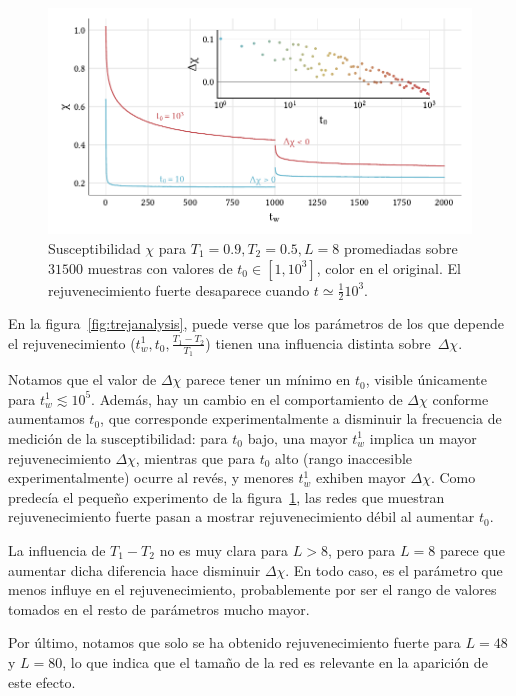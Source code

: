 \documentclass[11pt]{report}
\begin{document}
\begin{figure}
  \centering
  \includegraphics{../study_cases/vanishingrejuvenation/trej.pdf}
  \caption{Susceptibilidad $χ$ para $T_1=0.9, T_2=0.5, L=8$
    promediadas sobre $31500$ muestras con valores de $t_0∈[1,10^3]$,
    color en el original. El rejuvenecimiento fuerte desaparece cuando
    $t ≃ \frac{1}{2} 10^3$.}
  \label{fig:vanishing}
\end{figure}


En la figura~\ref{fig:trejanalysis}, puede verse que los parámetros de
los que depende el rejuvenecimiento ($t_w^1, t_0,
\frac{T_1-T_2}{T_1}$) tienen una influencia distinta sobre~$Δχ$.

Notamos que el valor de $Δχ$ parece tener un mínimo en $t_0$, visible
únicamente para $t_w^1 ≲10^5$. Además, hay un cambio en el
comportamiento de $Δχ$ conforme aumentamos $t_0$, que corresponde
experimentalmente a disminuir la frecuencia de medición de la
susceptibilidad: para $t_0$ bajo, una mayor $t_w^1$ implica un mayor
rejuvenecimiento $Δχ$, mientras que para $t_0$ alto (rango inaccesible
experimentalmente) ocurre al revés, y menores $t_w^1$ exhiben mayor
$Δχ$. Como predecía el pequeño experimento de la
figura~\ref{fig:vanishing}, las redes que muestran rejuvenecimiento
fuerte pasan a mostrar rejuvenecimiento débil al aumentar $t_0$.

La influencia de $T_1-T_2$ no es muy clara para $L>8$, pero para $L=8$
parece que aumentar dicha diferencia hace disminuir $Δχ$. En todo caso, es el
parámetro que menos influye en el rejuvenecimiento, probablemente por
ser el rango de valores tomados en el resto de parámetros mucho mayor.

Por último, notamos que solo se ha obtenido rejuvenecimiento fuerte
para $L=48$ y $L=80$, lo que indica que el tamaño de la red es
relevante en la aparición de este efecto.
\end{document}
